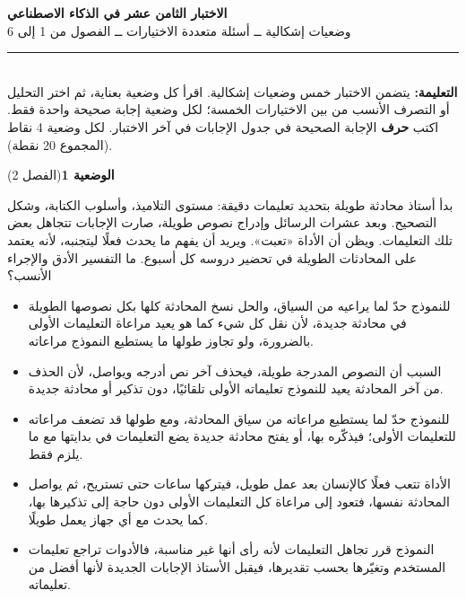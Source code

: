 \documentclass[11pt,a4paper]{article}
\begin{document}
\linespread{1.08}\selectfont
\begin{center}
{\LARGE\khatt\textbf{الاختبار الثامن عشر في الذكاء الاصطناعي}}\\[4pt]
{\normalsize وضعيات إشكالية ــ أسئلة متعددة الاختيارات ــ الفصول من 1 إلى 6}
\end{center}
\vspace{-2pt}\rule{\textwidth}{0.6pt}\\[2pt]
\textbf{التعليمة:} يتضمن الاختبار خمس وضعيات إشكالية. اقرأ كل وضعية بعناية، ثم اختر التحليل أو التصرف الأنسب
من بين الاختيارات الخمسة؛ لكل وضعية إجابة صحيحة واحدة فقط.
اكتب \textbf{حرف} الإجابة الصحيحة في جدول الإجابات في آخر الاختبار.
لكل وضعية 4 نقاط (المجموع 20 نقطة).
\vspace{4pt}

\noindent
{\large\khatt\textbf{الوضعية 1}}\hfill{\small(الفصل 2)}\par\nopagebreak\vspace{3pt}
\setlength{\fboxsep}{7pt}\colorbox{gray!10}{\parbox{\dimexpr\linewidth-14pt}{بدأ أستاذ محادثة طويلة بتحديد تعليمات دقيقة: مستوى التلاميذ، وأسلوب الكتابة، وشكل التصحيح. وبعد عشرات الرسائل وإدراج نصوص طويلة، صارت الإجابات تتجاهل بعض تلك التعليمات. ويظن أن الأداة «تعبت». ويريد أن يفهم ما يحدث فعلًا ليتجنبه، لأنه يعتمد على المحادثات الطويلة في تحضير دروسه كل أسبوع. ما التفسير الأدق والإجراء الأنسب؟}}\par\nopagebreak
\begin{itemize}[leftmargin=1.0cm, labelsep=6pt, itemsep=3pt, topsep=4pt, parsep=0pt]
  \item[\textbf{أ)}] للنموذج حدّ لما يراعيه من السياق، والحل نسخ المحادثة كلها بكل نصوصها الطويلة في محادثة جديدة، لأن نقل كل شيء كما هو يعيد مراعاة التعليمات الأولى بالضرورة، ولو تجاوز طولها ما يستطيع النموذج مراعاته.
  \item[\textbf{ب)}] السبب أن النصوص المدرجة طويلة، فيحذف آخر نص أدرجه ويواصل، لأن الحذف من آخر المحادثة يعيد للنموذج تعليماته الأولى تلقائيًا، دون تذكير أو محادثة جديدة.
  \item[\textbf{ج)}] للنموذج حدّ لما يستطيع مراعاته من سياق المحادثة، ومع طولها قد تضعف مراعاته للتعليمات الأولى؛ فيذكّره بها، أو يفتح محادثة جديدة يضع التعليمات في بدايتها مع ما يلزم فقط.
  \item[\textbf{د)}] الأداة تتعب فعلًا كالإنسان بعد عمل طويل، فيتركها ساعات حتى تستريح، ثم يواصل المحادثة نفسها، فتعود إلى مراعاة كل التعليمات الأولى دون حاجة إلى تذكيرها بها، كما يحدث مع أي جهاز يعمل طويلًا.
  \item[\textbf{هـ)}] النموذج قرر تجاهل التعليمات لأنه رأى أنها غير مناسبة، فالأدوات تراجع تعليمات المستخدم وتغيّرها بحسب تقديرها، فيقبل الأستاذ الإجابات الجديدة لأنها أفضل من تعليماته.
\end{itemize}
\end{document}
